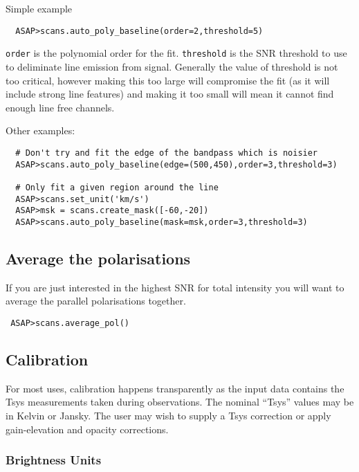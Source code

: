 \documentclass[11pt]{article}
\newcommand{\cmd}[1]{{\tt #1}}
\begin{document}
Simple example

\begin{verbatim}
  ASAP>scans.auto_poly_baseline(order=2,threshold=5)
\end{verbatim}

\cmd{order} is the polynomial order for the fit. \cmd{threshold} is
the SNR threshold to use to deliminate line emission from
signal. Generally the value of threshold is not too critical, however
making this too large will compromise the fit (as it will include
strong line features) and making it too small will mean it cannot find
enough line free channels.


Other examples:

\begin{verbatim}
  # Don't try and fit the edge of the bandpass which is noisier
  ASAP>scans.auto_poly_baseline(edge=(500,450),order=3,threshold=3)

  # Only fit a given region around the line
  ASAP>scans.set_unit('km/s')
  ASAP>msk = scans.create_mask([-60,-20])
  ASAP>scans.auto_poly_baseline(mask=msk,order=3,threshold=3)

\end{verbatim}

\subsection{Average the polarisations}

If you are just interested in the highest SNR for total intensity you
will want to average the parallel polarisations together.

\begin{verbatim}
 ASAP>scans.average_pol()
\end{verbatim}

\subsection{Calibration}

For most uses, calibration happens transparently as the input data
contains the Tsys measurements taken during observations. The nominal
``Tsys'' values may be in Kelvin or Jansky. The user may wish to
supply a Tsys correction or apply gain-elevation and opacity
corrections.

\subsubsection{Brightness Units}
\end{document}
